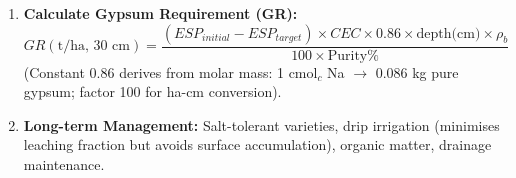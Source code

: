\documentclass[11pt]{article}
\begin{document}
\begin{methode}
\begin{enumerate}
\begin{itemize}
      \item \textbf{Sodic Soil:} \textbf{Chemical Amendment + Leaching.} Add Ca source (Gypsum CaSO$_4\cdot$2H$_2$O, or Sulphur/acid if calcareous) to replace Na$^+$ on exchange complex: $2Na^+_{ex} + Ca^{2+}_{sol} \rightarrow Ca^{2+}_{ex} + 2Na^+_{sol}$. Then leach Na$^+$ out. Deep ploughing to improve structure.
      \item \textbf{Saline-Sodic:} \textbf{Amendment first (Gypsum), then Leaching.} Gypsum prevents dispersion during leaching.
      \end{itemize}
\item \textbf{Calculate Gypsum Requirement (GR):} 
      \[
      GR (\text{t/ha, 30 cm}) = \frac{(ESP_{initial} - ESP_{target}) \times CEC \times 0.86 \times \text{depth(cm)} \times \rho_b}{100 \times \text{Purity}\%}
      \]
      (Constant 0.86 derives from molar mass: 1 cmol$_c$ Na $\rightarrow$ 0.086 kg pure gypsum; factor 100 for ha-cm conversion).
\item \textbf{Long-term Management:} Salt-tolerant varieties, drip irrigation (minimises leaching fraction but avoids surface accumulation), organic matter, drainage maintenance.
\end{enumerate}
\end{methode}
\end{document}
